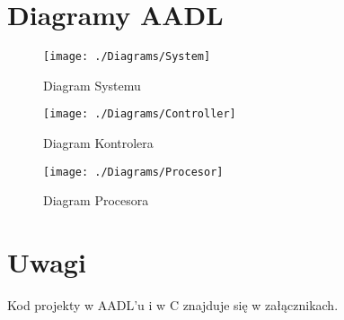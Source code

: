 \documentclass[a4paper, 11pt]{article}
\begin{document}
\section{Diagramy AADL}


\begin{figure}[H]
\centerline{\texttt{[image: ./Diagrams/System]}}
\caption{Diagram Systemu}
\end{figure}%
\begin{figure}[H]
\centerline{\texttt{[image: ./Diagrams/Controller]}}
\caption{Diagram Kontrolera}
\end{figure}%

\begin{figure}[H]
\centerline{\texttt{[image: ./Diagrams/Procesor]}}
\caption{Diagram Procesora}
\end{figure}%
\section{Uwagi}
Kod projekty w AADL'u i w C znajduje się w załącznikach.
%
%
\end{document}
